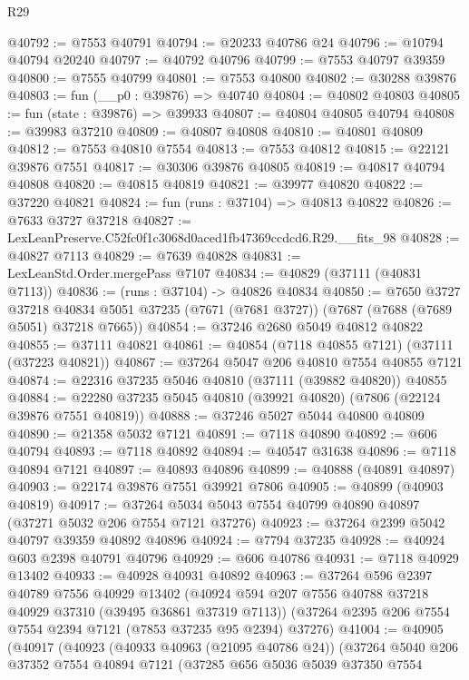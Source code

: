 \begin{lexlean}{R29}
\begin{coremodule}
@40792 := @7553 @40791
@40794 := @20233 @40786 @24
@40796 := @10794 @40794 @20240
@40797 := @40792 @40796
@40799 := @7553 @40797 @39359
@40800 := @7555 @40799
@40801 := @7553 @40800
@40802 := @30288 @39876
@40803 := fun (__p0 : @39876) => @40740
@40804 := @40802 @40803
@40805 := fun (state : @39876) => @39933
@40807 := @40804 @40805 @40794
@40808 := @39983 @37210
@40809 := @40807 @40808
@40810 := @40801 @40809
@40812 := @7553 @40810 @7554
@40813 := @7553 @40812
@40815 := @22121 @39876 @7551
@40817 := @30306 @39876 @40805
@40819 := @40817 @40794 @40808
@40820 := @40815 @40819
@40821 := @39977 @40820
@40822 := @37220 @40821
@40824 := fun (runs : @37104) => @40813 @40822
@40826 := @7633 @3727 @37218
@40827 := LexLeanPreserve.C52fc0f1c3068d0aced1fb47369ccdcd6.R29.__fits_98
@40828 := @40827 @7113
@40829 := @7639 @40828
@40831 := LexLeanStd.Order.mergePass @7107
@40834 := @40829 (@37111 (@40831 @7113))
@40836 := (runs : @37104) -> @40826 @40834
@40850 := @7650
    @3727
    @37218
    @40834
    @5051
    @37235
    (@7671 (@7681 @3727))
    (@7687 (@7688 (@7689 @5051) @37218 @7665))
@40854 := @37246 @2680 @5049 @40812 @40822
@40855 := @37111 @40821
@40861 := @40854 (@7118 @40855 @7121) (@37111 (@37223 @40821))
@40867 := @37264 @5047 @206 @40810 @7554 @40855 @7121
@40874 := @22316 @37235 @5046 @40810 (@37111 (@39882 @40820)) @40855
@40884 := @22280 @37235 @5045 @40810 (@39921 @40820) (@7806 (@22124 @39876 @7551 @40819))
@40888 := @37246 @5027 @5044 @40800 @40809
@40890 := @21358 @5032 @7121
@40891 := @7118 @40890
@40892 := @606 @40794
@40893 := @7118 @40892
@40894 := @40547 @31638
@40896 := @7118 @40894 @7121
@40897 := @40893 @40896
@40899 := @40888 (@40891 @40897)
@40903 := @22174 @39876 @7551 @39921 @7806
@40905 := @40899 (@40903 @40819)
@40917 := @37264 @5034 @5043 @7554 @40799 @40890 @40897 (@37271 @5032 @206 @7554 @7121 @37276)
@40923 := @37264 @2399 @5042 @40797 @39359 @40892 @40896
@40924 := @7794 @37235
@40928 := @40924 @603 @2398 @40791 @40796
@40929 := @606 @40786
@40931 := @7118 @40929 @13402
@40933 := @40928 @40931 @40892
@40963 := @37264
    @596
    @2397
    @40789
    @7556
    @40929
    @13402
    (@40924 @594 @207 @7556 @40788 @37218 @40929 @37310 (@39495 @36861 @37319 @7113))
    (@37264 @2395 @206 @7554 @7554 @2394 @7121 (@7853 @37235 @95 @2394) @37276)
@41004 := @40905
    (@40917
      (@40923
        (@40933 @40963 (@21095 @40786 @24))
        (@37264
          @5040
          @206
          @37352
          @7554
          @40894
          @7121
          (@37285
            @656
            @5036
            @5039
            @37350
            @7554

\end{coremodule}
\end{lexlean}
